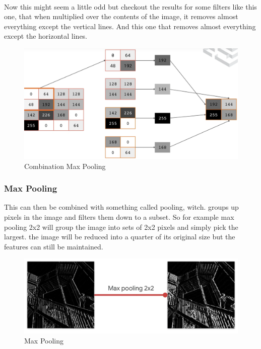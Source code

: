 \documentclass{article}
\begin{document}
    \paragraph{}
    Now this might seem a little odd but checkout the results for some filters like this one, that when multiplied over the contents of the image, it removes almost everything except the vertical lines. And this one that removes almost everything except the horizontal lines.
    \vspace{10mm}
    \begin{figure}[h!]
      \begin{center}
        \includegraphics[width=0.7\linewidth]{img/comp.png}
        \caption{Combination Max Pooling}
        \label{fig:snn}
      \end{center}
    \end{figure}
    \subsubsection{Max Pooling}
    This can then be combined with something called pooling, witch. groups up pixels in the image and filters them down to a subset. So for example max pooling 2x2 will group the image into sets of 2x2 pixels and simply pick the largest. the image will be reduced into a quarter of its original size but the features can still be maintained. 
    \vspace{40mm}
    \begin{figure}[h!]
      \begin{center}
        \includegraphics[width=0.7\linewidth]{img/maxpool.png}
        \caption{Max Pooling}
        \label{fig:snn}
      \end{center}
    \end{figure}
\end{document}
